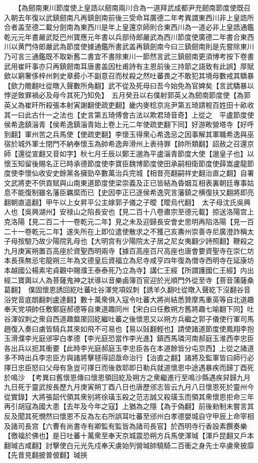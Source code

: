 　　【為劒南東川節度使上皇誥以劒南兩川合為一道拜武成都尹充劒南節度使既召入朝去年復以武鎮劒南凡再鎮劍南前後三受命耳廣德二年考異謂東西川非上皇誥所合者盖至德二載分劍南為東西川是年上皇還京師則合東西川為一道必非上皇誥通鑑乾元元年書嚴武貶巴州寶應元年書以兵部侍郎嚴武為西川節度使廣德二年書合東西川以黄門侍郎嚴武為節度使據通鑑所書武盖再鎮劍南今曰三鎮劒南則是先嘗除東川乃可言三通鑑既不取新舊二書宜不書除東川一節然言武三鎮劒南更須博考按下卷書武用崔旰事亦只再鎮劒南耳唐書盖因杜甫詩有主恩前後三持節之語致有此誤】厚賦歛以窮奢侈梓州刺史章彛小不副意召而杖殺之然吐蕃畏之不敢犯其境母數戒其驕暴【歛力贍翻吐從暾入聲數所角翻】武不從及死母曰吾今始免為官婢矣【言武驕暴以悖逆致罪禍必及母今其死乃知免】　五月癸丑以右僕射郭英乂為劒南節度使【為郭英乂為崔旰所殺張本射寅謝翻使疏吏翻】畿内麥稔京兆尹第五琦請稅百姓田十畝收其一曰此古什一之法也【史言第五琦傅會古法以欺君琦音奇】上從之　平盧節度使侯希逸鎮淄青【侯希逸鎮淄青始上卷上元二年使疏吏翻下同】好游畋營塔寺【好呼到翻】軍州苦之兵馬使【使疏吏翻】李懷玉得衆心希逸忌之因事解其軍職希逸與巫宿於城外軍士閉門不納奉懷玉為帥希逸奔滑州上表待罪【帥所類翻】詔赦之召還京師【還從宣翻又音如字】秋七月壬辰以鄭王邈為平盧淄青節度大使【邈皇子也】以懷玉知留後賜名正已時承德節度使李寶臣魏博節度使田承嗣相衛節度使薛嵩盧龍節度使李懷仙收安史餘黨各擁勁卒數萬治兵完城【相昔亮翻嗣祥史翻治直之翻】自署文武將吏不供貢賦與山南東道節度使梁崇義及正已皆結為昏姻互相表裏朝廷專事姑息不能復制雖名藩臣羈縻而已【史因李正已逐侯希逸究言藩鎮之横復扶又翻將即亮翻朝直遥翻】甲午以上女昇平公主嫁郭子儀之子曖【曖烏代翻】　太子母沈氏吳興人也【吳興湖州】安禄山之陷長安也【見二百十八卷肅宗至德元載】掠送洛陽宫上克洛陽【見二百二十一卷乾元二年】見之未及迎歸長安會史思明再陷洛陽【見一百二十一卷乾元二年】遂失所在上即位遣使散求之不獲己亥夀州崇善寺尼廣澄詐稱太子母按驗乃故少陽院乳母也【大明宫有少陽院太子居之尼女夷翻少詩照翻】鞭殺之　九月庚寅朔置百高座於資聖西明兩寺【據百高座百尺高座也唐會要資聖寺在崇仁坊本長孫無忌宅龍朔三年為文德皇后資福立為尼寺咸亨四年復為僧寺西明寺在延康坊本越國公楊素宅貞觀中賜濮王泰泰死乃立為寺】講仁王經【所謂護國仁王經】内出經二寶輿以人為菩薩鬼神之狀導以音樂鹵簿百官迎於光順門外從至寺【菩音蒲薩桑葛翻】　僕固懷恩誘回紇吐蕃吐谷渾党項奴刺【誘羊久翻吐從暾入聲紇下沒翻谷音浴党音底朗翻刺盧達翻】數十萬衆俱入寇令吐蕃大將尚結悉贊摩馬重英等自北道趣奉天党項帥任敷鄭庭郝德等自東道趣同州【宋白曰任敷朔方舊將趣七喻翻下同】吐谷渾奴刺之衆自西道趣盩厔回紇繼吐蕃之後懷恩又以朔方兵繼之郭子儀使行軍司馬趙復入奏曰虜皆騎兵其來如飛不可易也【易以䜴翻輕也】請使諸道節度使鳳翔李抱玉滑濮李光庭邠寜白孝德【李光庭恐當作李光進】鎮西馬璘河南郝庭玉淮西李忠臣各出兵以扼其衝要【此時李光庭郝庭玉李忠臣各在本道餘皆分屯京西】上從之諸道多不時出兵李忠臣方與諸將擊毬得詔亟命治行【治直之翻】諸將及監軍皆曰師行必擇日忠臣怒曰父母有急豈可擇日而後救耶即日勒兵就道懷恩中途遇暴疾而歸丁酉死於鳴沙　【考異曰舊懷恩傳曰懷恩領回紇及朔方之衆繼進行至鳴沙縣遇疾舁歸九月九日死于靈武按長歷九月庚寅朔丁酉八日也唐歷邠志皆云九月八日懷恩死於靈州今從實錄】大將張韶代領其衆别將徐璜玉殺之范志誠又殺璜玉而領其衆懷恩拒命三年再引胡寇為國大患【去年及今年之寇】上猶為之隱【為于偽翻】前後勑制未嘗言其反及聞其死憫然曰懷恩不反為左右所誤耳吐蕃至邠州白孝德嬰城自守甲辰上命宰相及諸司長宫【六曹有尚書寺有卿監有監皆為諸司長官】於西明寺行香設素饌奏樂【徼福於佛也】是日吐蕃十萬衆至奉天京城震恐朔方兵馬使渾瑊【渾戶昆翻又戶本翻瑊古咸翻】討擊使白元光先戍奉天虜始列營瑊帥驍騎二百衝之身先士卒虜衆披靡【先昔見翻披普佊翻】瑊挾